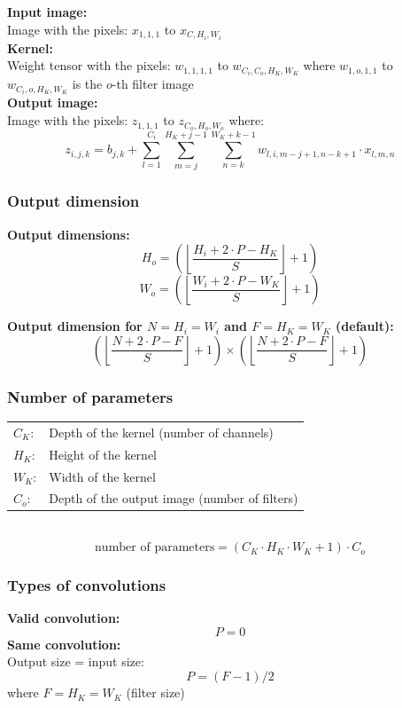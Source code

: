 \documentclass[10pt,a4paper]{article}
\begin{document}
\textbf{Input image:} \\
Image with the pixels: $x_{1,1,1}$ to $x_{C,H_i,W_i}$ \\

\textbf{Kernel:} \\
Weight tensor with the pixels: $w_{1,1,1,1}$ to $w_{C_i, C_o, H_K, W_K}$ where
$w_{1,o,1,1}$ to $w_{C_i, o, H_K, W_K}$ is the $o$-th filter image \\

\textbf{Output image:} \\
Image with the pixels: $z_{1,1,1}$ to $z_{C_o, H_o, W_o}$ where:
$$
	z_{i,j,k} = b_{j,k} + \sum_{l = 1}^{C_i} \sum_{m = j}^{H_K + j - 1} \sum_{n = k}^{W_K + k - 1} w_{l,i,m-j+1,n-k+1} ⋅ x_{l,m,n}
$$

\subsubsection{Output dimension}

\textbf{Output dimensions:} ~\\
$$
	H_o = \left(\left\lfloor \frac{H_i + 2 ⋅ P - H_K}{S} \right\rfloor + 1\right)
$$
$$
	W_o = \left(\left\lfloor \frac{W_i + 2 ⋅ P - W_K}{S} \right\rfloor + 1\right)
$$

\textbf{Output dimension for $N = H_i = W_i$ and $F = H_K = W_K$ (default):}
$$
	\left(\left\lfloor \frac{N + 2 ⋅ P - F}{S} \right\rfloor + 1\right) \times \left(\left\lfloor \frac{N + 2 ⋅ P - F}{S} \right\rfloor + 1\right)
$$

\subsubsection{Number of parameters}
\begin{tabular}{ll}
	$C_K$: & Depth of the kernel (number of channels) \\
	$H_K$: & Height of the kernel \\
	$W_K$: & Width of the kernel \\
	$C_o$: & Depth of the output image (number of filters)\\
\end{tabular} ~\\
$$
	\text{number of parameters} = (C_K ⋅ H_K ⋅ W_K + 1) ⋅ C_o
$$

\subsubsection{Types of convolutions}
	\textbf{Valid convolution:} \\
	$$
		P = 0
	$$
	\textbf{Same convolution:} \\
	Output size = input size:
	$$
		P = (F - 1) / 2
	$$ where
	$F = H_K = W_K$ (filter size)
	
\end{document}
